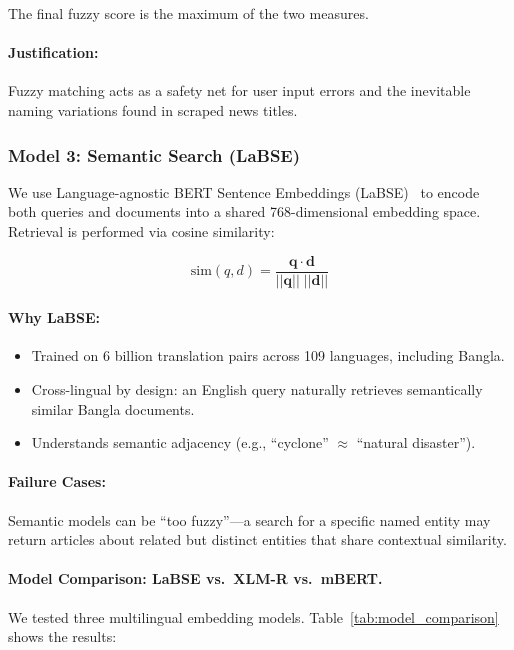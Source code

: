 \documentclass[12pt,a4paper]{article}
\begin{document}
The final fuzzy score is the maximum of the two measures.

\paragraph{Justification:} Fuzzy matching acts as a safety net for user input errors and the inevitable naming variations found in scraped news titles.

\subsubsection{Model 3: Semantic Search (LaBSE)}

We use Language-agnostic BERT Sentence Embeddings (LaBSE)~\cite{feng2022} to encode both queries and documents into a shared 768-dimensional embedding space. Retrieval is performed via cosine similarity:

\begin{equation}
\text{sim}(q, d) = \frac{\mathbf{q} \cdot \mathbf{d}}{||\mathbf{q}|| \; ||\mathbf{d}||}
\end{equation}

\paragraph{Why LaBSE:}
\begin{itemize}
    \item Trained on 6 billion translation pairs across 109 languages, including Bangla.
    \item Cross-lingual by design: an English query naturally retrieves semantically similar Bangla documents.
    \item Understands semantic adjacency (e.g., ``cyclone'' $\approx$ ``natural disaster'').
\end{itemize}

\paragraph{Failure Cases:} Semantic models can be ``too fuzzy''---a search for a specific named entity may return articles about related but distinct entities that share contextual similarity.

\paragraph{Model Comparison: LaBSE vs.\ XLM-R vs.\ mBERT.}
We tested three multilingual embedding models. Table~\ref{tab:model_comparison} shows the results:
\end{document}
